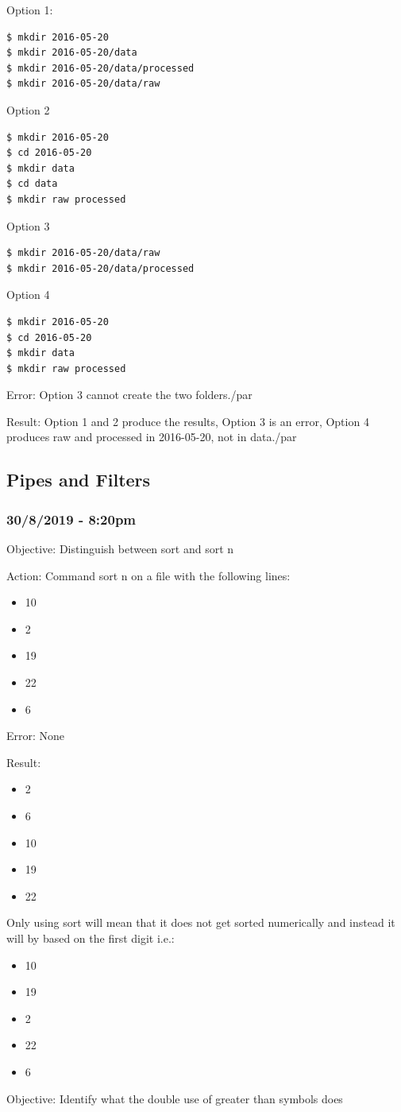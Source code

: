 \documentclass{article}
\begin{document}
Option 1:
\begin{verbatim}$ mkdir 2016-05-20
$ mkdir 2016-05-20/data
$ mkdir 2016-05-20/data/processed
$ mkdir 2016-05-20/data/raw\end{verbatim}

Option 2
\begin{verbatim}$ mkdir 2016-05-20
$ cd 2016-05-20
$ mkdir data
$ cd data
$ mkdir raw processed\end{verbatim}

Option 3
\begin{verbatim}$ mkdir 2016-05-20/data/raw
$ mkdir 2016-05-20/data/processed\end{verbatim}

Option 4
\begin{verbatim}$ mkdir 2016-05-20
$ cd 2016-05-20
$ mkdir data
$ mkdir raw processed\end{verbatim}

Error: Option 3 cannot create the two folders./par

Result: Option 1 and 2 produce the results, Option 3 is an error, Option 4 produces raw and processed in 2016-05-20, not in data./par

\subsection{Pipes and Filters}
\subsubsection*{30/8/2019 - 8:20pm}

Objective: Distinguish between sort and sort n 

Action: Command sort n on a file with the following lines:
\begin{itemize}
\item 10 
\item 2
\item 19
\item 22
\item 6
\end{itemize}
Error: None

Result:\par
\begin{itemize}
\item 2
\item 6
\item 10
\item 19
\item 22
\end{itemize}
Only using sort will mean that it does not get sorted numerically and instead it will by based on the first digit i.e.:\par
\begin{itemize}
\item 10
\item 19
\item 2
\item 22
\item 6
\end{itemize}
Objective: Identify what the double use of greater than symbols does\par
\end{document}
